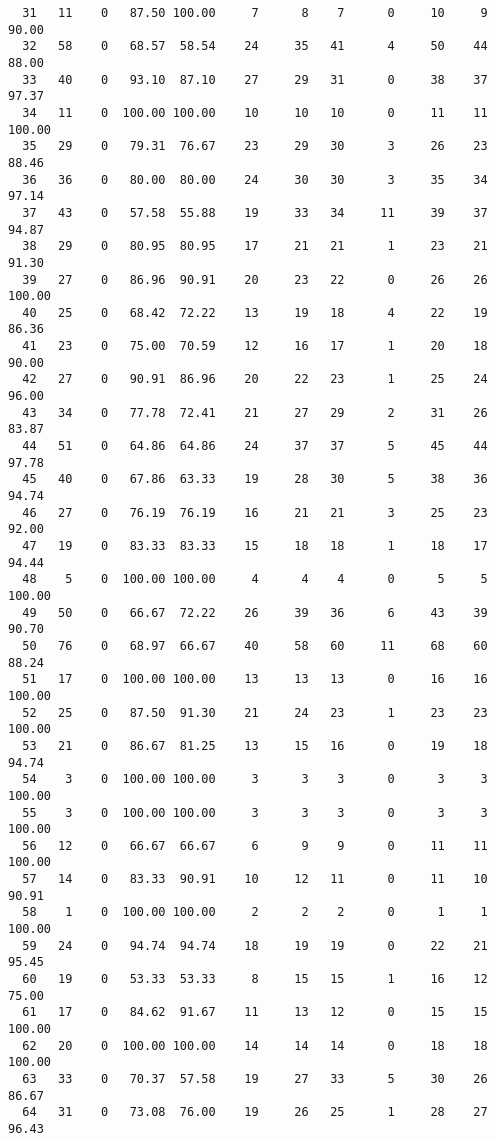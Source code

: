 \begin{verbatim}
  31   11    0   87.50 100.00     7      8    7      0     10     9    90.00
  32   58    0   68.57  58.54    24     35   41      4     50    44    88.00
  33   40    0   93.10  87.10    27     29   31      0     38    37    97.37
  34   11    0  100.00 100.00    10     10   10      0     11    11   100.00
  35   29    0   79.31  76.67    23     29   30      3     26    23    88.46
  36   36    0   80.00  80.00    24     30   30      3     35    34    97.14
  37   43    0   57.58  55.88    19     33   34     11     39    37    94.87
  38   29    0   80.95  80.95    17     21   21      1     23    21    91.30
  39   27    0   86.96  90.91    20     23   22      0     26    26   100.00
  40   25    0   68.42  72.22    13     19   18      4     22    19    86.36
  41   23    0   75.00  70.59    12     16   17      1     20    18    90.00
  42   27    0   90.91  86.96    20     22   23      1     25    24    96.00
  43   34    0   77.78  72.41    21     27   29      2     31    26    83.87
  44   51    0   64.86  64.86    24     37   37      5     45    44    97.78
  45   40    0   67.86  63.33    19     28   30      5     38    36    94.74
  46   27    0   76.19  76.19    16     21   21      3     25    23    92.00
  47   19    0   83.33  83.33    15     18   18      1     18    17    94.44
  48    5    0  100.00 100.00     4      4    4      0      5     5   100.00
  49   50    0   66.67  72.22    26     39   36      6     43    39    90.70
  50   76    0   68.97  66.67    40     58   60     11     68    60    88.24
  51   17    0  100.00 100.00    13     13   13      0     16    16   100.00
  52   25    0   87.50  91.30    21     24   23      1     23    23   100.00
  53   21    0   86.67  81.25    13     15   16      0     19    18    94.74
  54    3    0  100.00 100.00     3      3    3      0      3     3   100.00
  55    3    0  100.00 100.00     3      3    3      0      3     3   100.00
  56   12    0   66.67  66.67     6      9    9      0     11    11   100.00
  57   14    0   83.33  90.91    10     12   11      0     11    10    90.91
  58    1    0  100.00 100.00     2      2    2      0      1     1   100.00
  59   24    0   94.74  94.74    18     19   19      0     22    21    95.45
  60   19    0   53.33  53.33     8     15   15      1     16    12    75.00
  61   17    0   84.62  91.67    11     13   12      0     15    15   100.00
  62   20    0  100.00 100.00    14     14   14      0     18    18   100.00
  63   33    0   70.37  57.58    19     27   33      5     30    26    86.67
  64   31    0   73.08  76.00    19     26   25      1     28    27    96.43

\end{verbatim}
